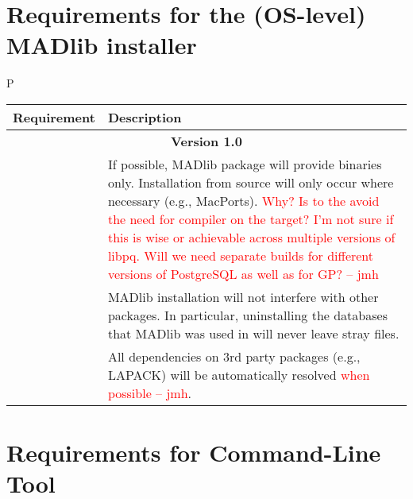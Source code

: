 \documentclass[11pt]{article}
\newcommand{\jmh}[1]{{\textcolor{red}{#1 -- jmh}}}
\begin{document}
{\section{Requirements for the (OS-level) MADlib installer}

\begin{mlreq}{P}
\begin{tabular}{|l|p{133mm}|}
\hline
	\textbf{Requirement} & \textbf{Description} \\
\hline
	\multicolumn{2}{|c|}{\bf Version 1.0} \\
\hline
	\mlr & If possible, MADlib package will provide binaries only. Installation from source will only occur where necessary (e.g., MacPorts). \jmh{Why?  Is to the avoid the need for compiler on the target?  I'm not sure if this is wise or achievable across multiple versions of libpq.  Will we need separate builds for different versions of PostgreSQL as well as for GP?}\\
\hline
	\mlr & MADlib installation will not interfere with other packages. In particular, uninstalling the databases that MADlib was used in will never leave stray files. \\
\hline
	\mlr & All dependencies  on 3rd party packages (e.g., LAPACK) will be automatically resolved \jmh{when possible}. \\
\hline

\end{tabular}
\end{mlreq}

\section{Requirements for Command-Line Tool}
	
}
\end{document}
